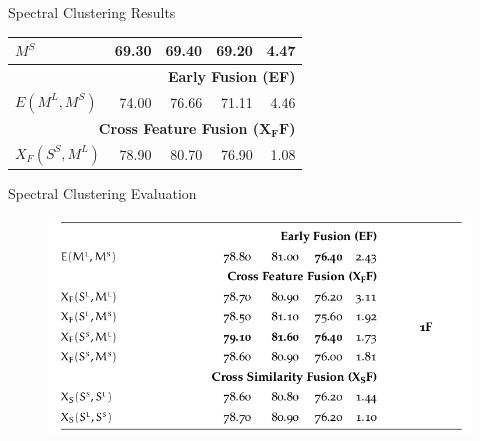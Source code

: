 \documentclass[10pt,=table]{beamer}
\newcommand\mlex{M^{\scriptscriptstyle L}}
\newcommand\msyn{M^{\scriptscriptstyle S}}
\newcommand\ssyn{S^{\scriptscriptstyle S}}
\begin{document}
\begin{frame}{Spectral Clustering Results}
\begin{overprint}
\begin{minipage}[c][.8\textheight][c]{\linewidth}
\begin{tabular}{@{}lrrrr@{}}
		 	$\msyn$                    &	69.30	& 69.40 & 69.20 & 4.47\\
		    \midrule 
		    \multicolumn{5}{r}{\textbf{Early Fusion (EF)}} \\ %
   			\rowcolor{orangeEric!70} 
		    $E(\mlex, \msyn)$		&	{74.00}	& 76.66 & {71.11} & 4.46\\
			\midrule \midrule
	       \multicolumn{5}{r}{\textbf{Cross Feature Fusion ($\mathbf{X_FF}$)}}       \\
 		   \rowcolor{greenEric!70} 
       	   $X_F(\ssyn, \mlex)$		&	{78.90}	& 80.70 & {76.90}	 & 1.08 \\	   	         
       	   \bottomrule
			\end{tabular}		
		\end{minipage}
	
	\end{overprint}


	
\end{frame}

\begin{frame}{Spectral Clustering Evaluation}
\begin{figure}
	\centering 
	\includegraphics[width=1\linewidth]{image2/Chapitre4/wsd_PA_SR}
\end{figure}
\end{frame}
\end{document}
